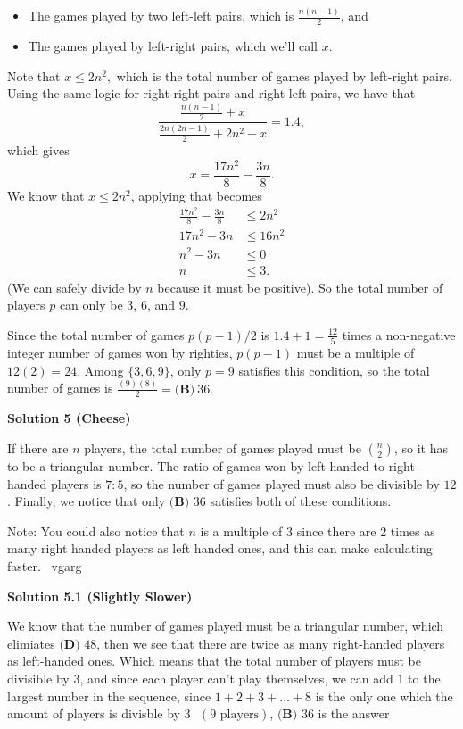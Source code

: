 \begin{enumerate}
 
            \begin{itemize}
        \item The games played by two left-left pairs, which is $\frac{n(n-1)}{2}$, and
        \item The games played by left-right pairs, which we'll call $x$.
            \end{itemize}
            Note that $x\leq 2n^2,$ which is the total number of games played by left-right pairs. Using the same logic for right-right pairs and right-left pairs, we have that 
 \[\frac{\frac{n(n-1)}{2}+x}{\frac{2n(2n-1)}{2}+2n^2-x}=1.4,\] which gives 
 \[x=\frac{17n^2}{8}-\frac{3n}{8}.\] We know that $x\leq 2n^2$, applying that becomes
 \begin{align*} \frac{17n^2}{8}-\frac{3n}{8} &\le 2n^2 \\ 17n^2 - 3n &\le 16n^2 \\ n^2 - 3n &\le 0 \\ n &\le 3. \end{align*}
(We can safely divide by $n$ because it must be positive). So the total number of players $p$ can only be $3$, $6$, and $9$. 

 Since the total number of games $p(p-1)/2$  is $1.4+1 = \frac{12}{5}$ times a non-negative integer number of games won by righties, $p(p-1)$ must be a multiple of $12(2) = 24$. Among $\{3,6,9\}$, only $p = 9$ satisfies this condition,  so the total number of games is $\frac{(9)(8)}{2} = \boxed{\textbf{(B)}\ 36}.$




\textbf{Solution 5 (Cheese)}

If there are $n$ players, the total number of games played must be $\binom{n}{2}$, so it has to be a triangular number. The ratio of games won by left-handed to right-handed players is $7:5$, so the number of games played must also be divisible by $12$. Finally, we notice that only $\boxed{\textbf{(B) }36}$ satisfies both of these conditions.

 Note: You could also notice that $n$ is a multiple of $3$ since there are $2$ times as many right handed players as left handed ones, and this can make calculating faster. ~vgarg

 



\textbf{Solution 5.1 (Slightly Slower)}

We know that the number of games played must be a triangular number, which elimiates ${\textbf{(D) }48}$, then we see that there are twice as many right-handed players as left-handed ones. Which means that the total number of players must be divisible by $3$, and since each player can't play themselves, we can add $1$ to the largest number in the sequence, since $1 + 2 + 3 + \dots + 8$ is the only one which the amount of players is divisble by $3\text{ }(9 \text{ players})$, $\boxed{\textbf{(B) }36}$ is the answer


\end{enumerate}
